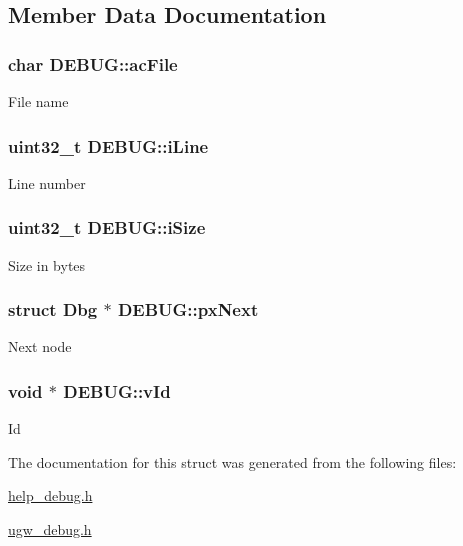 \subsection{Member Data Documentation}
\hypertarget{structDEBUG_a398250c97a7a65717049ce5dd515eba2}{
\subsubsection[{ac\-File}]{\setlength{\rightskip}{0pt plus 5cm}char D\-E\-B\-U\-G\-::ac\-File}}\label{structDEBUG_a398250c97a7a65717049ce5dd515eba2}
File name \hypertarget{structDEBUG_a50c914ade034df26663794c6a54b6a58}{
\subsubsection[{i\-Line}]{\setlength{\rightskip}{0pt plus 5cm}uint32\-\_\-t D\-E\-B\-U\-G\-::i\-Line}}\label{structDEBUG_a50c914ade034df26663794c6a54b6a58}
Line number \hypertarget{structDEBUG_a8a4025e8fccfbbf95c3568789d3690a6}{
\subsubsection[{i\-Size}]{\setlength{\rightskip}{0pt plus 5cm}uint32\-\_\-t D\-E\-B\-U\-G\-::i\-Size}}\label{structDEBUG_a8a4025e8fccfbbf95c3568789d3690a6}
Size in bytes \hypertarget{structDEBUG_a8e59a4facf10cd60c28bf77bc2ab9e1e}{
\subsubsection[{px\-Next}]{\setlength{\rightskip}{0pt plus 5cm}struct Dbg $\ast$ D\-E\-B\-U\-G\-::px\-Next}}\label{structDEBUG_a8e59a4facf10cd60c28bf77bc2ab9e1e}
Next node \hypertarget{structDEBUG_ae273fbad6ce7ff3df56041bdbc98d119}{
\subsubsection[{v\-Id}]{\setlength{\rightskip}{0pt plus 5cm}void $\ast$ D\-E\-B\-U\-G\-::v\-Id}}\label{structDEBUG_ae273fbad6ce7ff3df56041bdbc98d119}
Id 

The documentation for this struct was generated from the following files\-:\begin{DoxyCompactItemize}
\item 
\hyperlink{help__debug_8h}{help\-\_\-debug.\-h}\item 
\hyperlink{ugw__debug_8h}{ugw\-\_\-debug.\-h}\end{DoxyCompactItemize}
